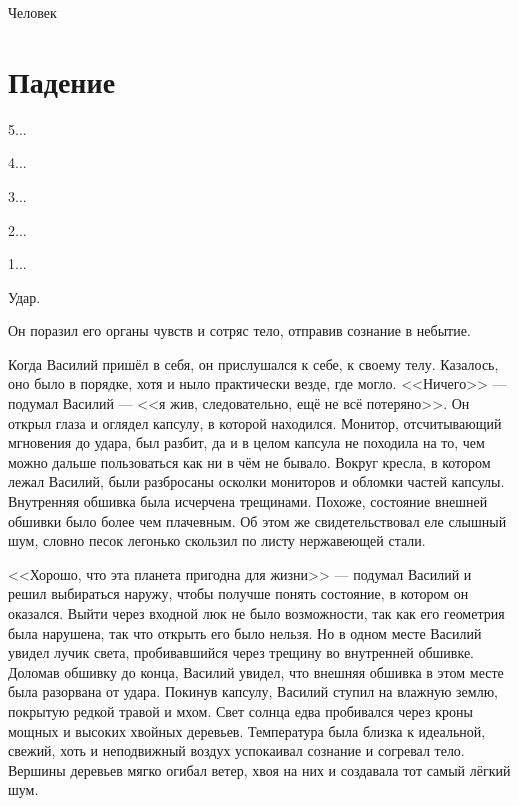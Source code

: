 \documentclass[12pt]{article}
\begin{document}
\renewcommand{\contentsname}{Содержание}

\newcommand{\newsection}[1]
{
	\suppressfloats[t]

	\section{#1}
}

\newcommand{\newsectionnonum}[1]
{
	\suppressfloats[t]

	\section*{#1}
	\addcontentsline{toc}{section}{#1}
}


{
	\Huge
	\bfseries
	\centerline{Человек}
}

\tableofcontents

\newpage

\newsection{Падение}

5...\newline

4...\newline

3...\newline

2...\newline

1...\newline

Удар.\newline

Он поразил его органы чувств и сотряс тело, отправив сознание в
небытие.\newline

Когда Василий пришёл в себя, он прислушался к себе, к своему телу. Казалось,
оно было в порядке, хотя и ныло практически везде, где могло.
<<Ничего>> --- подумал Василий --- <<я жив, следовательно, ещё не всё
потеряно>>. Он открыл глаза и оглядел капсулу, в которой находился.
Монитор, отсчитывающий мгновения до удара, был разбит, да и в целом капсула
не походила на то, чем можно дальше пользоваться как ни в чём не бывало.
Вокруг кресла, в котором лежал Василий, были разбросаны осколки мониторов и
обломки частей капсулы. Внутренняя обшивка была исчерчена трещинами.
Похоже, состояние внешней обшивки было более чем плачевным. Об этом же
свидетельствовал еле слышный шум, словно песок легонько скользил по листу
нержавеющей стали.

<<Хорошо, что эта планета пригодна для жизни>> ---
подумал Василий и решил выбираться наружу, чтобы получше понять состояние,
в котором он оказался. Выйти через входной люк не было возможности, так как
его геометрия была нарушена, так что открыть его было нельзя. Но в одном месте
Василий увидел лучик света, пробивавшийся через трещину во внутренней обшивке.
Доломав обшивку до конца, Василий увидел, что внешняя обшивка в этом месте
была разорвана от удара. Покинув капсулу, Василий ступил на влажную землю,
покрытую редкой травой и мхом. Свет солнца едва пробивался через кроны
мощных и высоких хвойных деревьев. Температура была близка к идеальной,
свежий, хоть и неподвижный воздух успокаивал сознание и согревал тело.
Вершины деревьев мягко огибал ветер, хвоя на них и создавала тот самый
лёгкий шум.
\end{document}
